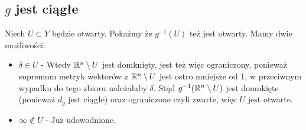 \subsection*{$g$ jest ciągłe}
Niech $ U \subset Y$ będzie otwarty. Pokażmy że $g^{-1}(U)$ też jest otwarty. Mamy dwie możliwości:
\begin{itemize}
  \item $\delta \in U$ - Wtedy ${\mathbb{R}}^n \setminus U$ jest domknięty, jest też więc ograniczony, ponieważ supremum metryk wektorów z ${\mathbb{R}}^n \setminus U$ jest ostro mniejsze od 1, w przeciwnym wypadku do tego zbioru należałaby $\delta$. Stąd $g^{-1}({\mathbb{R}}^n \setminus U)$ jest domnkięte (ponieważ $d_g$ jest ciągłe) oraz ograniczone czyli zwarte, więc $U$ jest otwarte.
  \item $\infty \not \in U$ - Już udowodnione.
\end{itemize}
